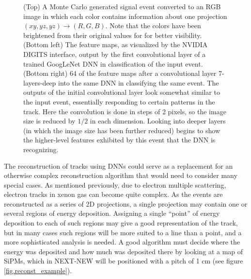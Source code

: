 \documentclass[11pt,a4paper]{article}
\begin{document}
\begin{figure}[!htb]
	\caption{\label{fig.featuremaps}(Top) A Monte Carlo generated signal event converted to an RGB image in which each color contains information about one projection $(xy, yz, yz) \rightarrow (R, G, B)$.  Note that the colors have been brightened from their original values for for better visibility. (Bottom left) The feature maps, as visualized by the NVIDIA DIGITS \cite{DIGITS} interface, output by the first convolutional layer of a trained GoogLeNet DNN in classification of the input event. (Bottom right) 64 of the feature maps after a convolutional layer 7-layers-deep into the same DNN in classifying the same event. The outputs of the initial convolutional layer look somewhat similar to the input event, essentially responding to certain patterns in the track. Here the convolution is done in steps of 2 pixels, so the image size is reduced by $1/2$ in each dimension. Looking into deeper layers (in which the image size has been further reduced) begins to show the higher-level features exhibited by this event that the DNN is recognizing.}
\end{figure}

The reconstruction of tracks using DNNs could serve as a replacement for an otherwise complex reconstruction algorithm that would need to consider many special cases. As mentioned previously, due to electron multiple scattering, electron tracks in xenon gas can become quite complex. As the events are reconstructed as a series of 2D projections, a single projection may contain one or several regions of energy deposition. Assigning a single ``point'' of energy deposition to each of such regions may give a good representation of the track, but in many cases such regions will be more suited to a line than a point, and a more sophisticated analysis is needed. A good algorithm must decide where the energy was deposited and how much was deposited there by looking at a map of SiPMs, which in NEXT-NEW will be positioned with a pitch of 1 cm (see figure \ref{fig.reconst_example}).
\end{document}
